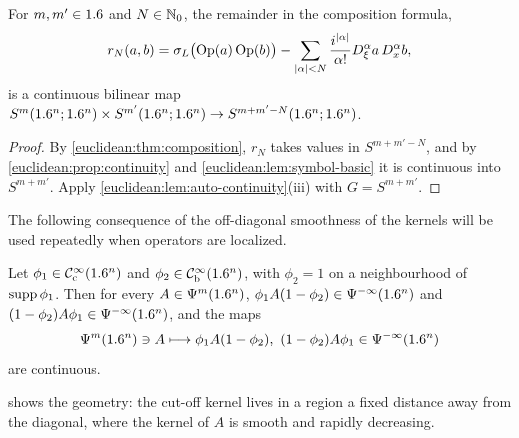 \begin{corollary}\label{euclidean:cor:remainder-continuous}
  For $m,m'\in1.6$ and $N\in\mathbb{N}_0$, the remainder in the composition formula,
  \begin{equation*}
    r_N(a,b)=\sigma_L\bigl(\operatorname{Op}(a)\operatorname{Op}(b)\bigr)-\sum_{\lvert \alpha\rvert<N}
    \frac{i^{\lvert \alpha\rvert}}{\alpha!}D^\alpha_\xi a\,D^\alpha_xb,
  \end{equation*}
  is a continuous bilinear map
  $S^m(1.6^n;1.6^n)\times S^{m'}(1.6^n;1.6^n)\to S^{m+m'-N}(1.6^n;1.6^n)$.
\end{corollary}
\begin{proof}
  By \cref{euclidean:thm:composition}, $r_N$ takes values in $S^{m+m'-N}$, and
  by \cref{euclidean:prop:continuity} and \cref{euclidean:lem:symbol-basic} it
  is continuous into $S^{m+m'}$. Apply
  \cref{euclidean:lem:auto-continuity}(iii) with $G=S^{m+m'}$.
\end{proof}

The following consequence of the off-diagonal smoothness of the kernels
will be used repeatedly when operators are localized.

\begin{lemma}\label{euclidean:lem:off-diagonal-cutoff}
  Let $\phi_1\in\mathcal{C}^\infty_{\mathrm{c}}(1.6^n)$ and $\phi_2\in\mathcal{C}^\infty_{\mathrm{b}}(1.6^n)$, with $\phi_2=1$ on a
  neighbourhood of $\operatorname{supp}\phi_1$. Then for every $A\in\Psi^{m}(1.6^n)$,
  $\phi_1A(1-\phi_2)\in\Psi^{-\infty}(1.6^n)$ and
  $(1-\phi_2)A\phi_1\in\Psi^{-\infty}(1.6^n)$, and the maps
  \begin{equation*}
    \Psido m(\R^n)\ni A\longmapsto\phi_1A(1-\phi_2),\ (1-\phi_2)A\phi_1\in\Psido{-\infty}(\R^n)
  \end{equation*}
  are continuous.
\end{lemma}
 shows the geometry: the cut-off kernel lives in a
region a fixed distance away from the diagonal, where the kernel of $A$ is smooth and
rapidly decreasing.

